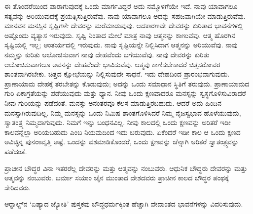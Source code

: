 ಈ ತೊಂದರೆಯಿಂದ ಪಾರಾಗುವುದಕ್ಕೆ ಒಂದು ಮಾರ್ಗವಿದ್ದರೆ ಅದು ನಮ್ಮೊಳಗೆಯೇ ಇದೆ. ನಾವು ಯಾವಾಗಲೂ ಸತ್ಯವನ್ನು ಅರಿಯುವುದಕ್ಕೆ ಪ್ರಯತ್ನಿಸುತ್ತಿರುವೆವು. ನಾವು ಯಾವಾಗಲೂ ಅದನ್ನು ಸಹಜವಾಗಿಯೇ ಮಾಡುತ್ತಿರುವೆವು. ಮಾನವನ ಮನಸ್ಸಿನ ಸೃಷ್ಟಿಗಳೇ ದೇವರನ್ನು ಮರೆಮಾಡುವುವು. ಆದಕಾರಣವೇ ದೇವರನ್ನು ಕುರಿತಾದ ಭಾವನೆಗಳಲ್ಲಿ ಅಷ್ಟೊಂದು ವ್ಯತ್ಯಾಸ ಇರುವುದು. ಸೃಷ್ಟಿ ನಿಂತಾದ ಮೇಲೆ ಮಾತ್ರ ನಾವು ಆತ್ಮನನ್ನು ಕಾಣುವೆವು. ಆತ್ಮ ಹೊರಗಿನ ಸೃಷ್ಟಿಯಲ್ಲಿ ಇಲ್ಲ; ಆಂತರ್ಯದಲ್ಲಿ ಇರುವುದು. ನಾವು ಸೃಷ್ಟಿಯನ್ನೇ ನಿಲ್ಲಿಸಿದಾಗ ಆತ್ಮನನ್ನು ಅರಿಯುವೆವು. ನಾವು ನಮ್ಮನ್ನು ಕುರಿತು ಆಲೋಚಿಸುವಾಗ ನಾವು ದೇಹವೆಂದು ಬಗೆಯುವೆವು. ನಾವು ದೇವರನ್ನು ಕುರಿತು ಆಲೋಚಿಸುವಾಗಲೂ ಅವನನ್ನು ದೇಹವೆಂದೇ ಭಾವಿಸುವೆವು. ಆತ್ಮವು ಕಾಣಿಸಬೇಕಾದರೆ ಚಿತ್ತಸರೋವರ ಶಾಂತವಾಗಿರಬೇಕು. ಚಿತ್ತದ ಕ್ಷೋಭೆಯನ್ನು ನಿಲ್ಲಿಸುವುದೇ ಸಾಧನೆ. ಇದು ದೇಹದಿಂದ ಪ್ರಾರಂಭವಾಗುವುದು. ಪ್ರಾಣಾಯಾಮ ದೇಹಕ್ಕೆ ತರಬೇತನ್ನು ಕೊಡುವುದು; ಅದನ್ನು ಒಂದು ಸಮಾಧಾನ ಸ್ಥಿತಿಗೆ ತರುವುದು. ಪ್ರಾಣಾಯಾಮದ ಗುರಿ ಏಕಾಗ್ರತೆಯನ್ನು ಪಡೆಯುವುದು ಮತ್ತು ಧ್ಯಾನ. ನೀವು ಒಂದು ಕ್ಷಣವಾದರೂ ಮನಸ್ಸನ್ನು ಸ್ವಸ್ಥಗೊಳಿಸುವಿರಾದರೆ ನೀವು ಗುರಿಯನ್ನು ಪಡೆದಂತೆ. ಮನಸ್ಸು ಅನಂತರವೂ ಕೆಲಸ ಮಾಡುತ್ತಿರಬಹುದು. ಆದರೆ ಅದು ಹಿಂದಿನ ಮನಸ್ಸಾಗಿರುವುದಿಲ್ಲ. ನಿಮ್ಮ ಮನಸ್ಸನ್ನು ಒಂದು ನಿಮಿಷ ಶಾಂತಗೊಳಿಸಿದರೆ ನಿಮ್ಮ ನೈಜಸ್ವಭಾವ ಹೊಳೆಯುವುದು, ಸ್ವಾತಂತ್ರ್ಯ ನಿಮ್ಮದಾಗುವುದು. ನಿಮಗೆ ಇನ್ನು ಬಂಧನವಿಲ್ಲ. ನೀವು ಕಾಲದಲ್ಲಿ ಒಂದು ಕ್ಷಣವನ್ನು ಅರಿತರೆ ಇಡೀ ಕಾಲವನ್ನೆಲ್ಲಾ ಅರಿಯಬಹುದು ಎಂಬ ನಿಯಮದಿಂದ ಇದು ಬರುವುದು. ಏಕೆಂದರೆ ಇಡೀ ಕಾಲ ಆ ಒಂದು ಕ್ಷಣದ ಅವಿಚ್ಛಿನ್ನ ಪುನರಾವೃತ್ತಿ ಅಷ್ಟೆ. ಒಂದನ್ನು ವಶಮಾಡಿಕೊಂಡರೆ, ಒಂದು ಕ್ಷಣವನ್ನು ಚೆನ್ನಾಗಿ ಅರಿತರೆ ಸ್ವಾತಂತ್ರ್ಯವನ್ನು ಪಡೆದಂತೆ.

ಪ್ರಾಚೀನ ಬೌದ್ಧರ ವಿನಾ ಇತರರೆಲ್ಲ ದೇವರನ್ನು ಮತ್ತು ಆತ್ಮವನ್ನು ನಂಬುವರು. ಆಧುನಿಕ ಬೌದ್ಧರು ದೇವರನ್ನು ಮತ್ತು ಆತ್ಮವನ್ನು ನಂಬುವರು. ಬರ್ಮಾ ಸಯಾಂ ಚೈನ ಮುಂತಾದ ದೇಶದವರು ಪ್ರಾಚೀನ ಕಾಲದ ಬೌದ್ಧರ ಪಂಥಕ್ಕೆ ಸೇರಿದವರು.

ಆರ‌್ನಾ‌ಲ್ಡ್​ನ ‘ಏಷ್ಯಾದ ಜ್ಯೋತಿ’ ಪುಸ್ತಕವು ಬೌದ್ಧಧರ್ಮಕ್ಕಿಂತ ಹೆಚ್ಚಾಗಿ ವೇದಾಂತದ ಭಾವನೆಗಳನ್ನು ವಿವರಿಸುವುದು.


